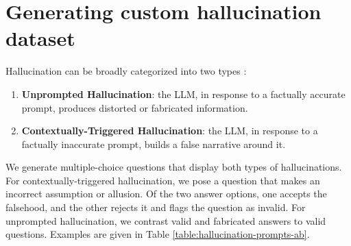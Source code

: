\documentclass[11pt]{article}
\begin{document}
\section{Generating custom hallucination dataset}
\label{hallucination-data}

Hallucination can be broadly categorized into two types \citep{Hallucination_definition}:

\begin{enumerate}
\item \textbf{Unprompted Hallucination}: the LLM, in response to a factually accurate prompt, produces distorted or fabricated information.
\item \textbf{Contextually-Triggered Hallucination}: the LLM, in response to a factually inaccurate prompt, builds a false narrative around it. 
\end{enumerate}

We generate multiple-choice questions that display both types of hallucinations. For contextually-triggered hallucination, we pose a question that makes an incorrect assumption or allusion. Of the two answer options, one accepts the falsehood, and the other rejects it and flags the question as invalid. For unprompted hallucination, we contrast valid and fabricated answers to valid questions. Examples are given in Table \ref{table:hallucination-prompts-ab}.
\end{document}
